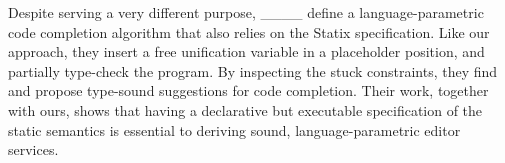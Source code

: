 Despite serving a very different purpose, ____ define a language-parametric code completion algorithm that also relies on the Statix specification.
Like our approach, they insert a free unification variable in a placeholder position, and partially type-check the program.
By inspecting the stuck constraints, they find and propose type-sound suggestions for code completion.
Their work, together with ours, shows that having a declarative but executable specification of the static semantics is essential to deriving sound, language-parametric editor services.



